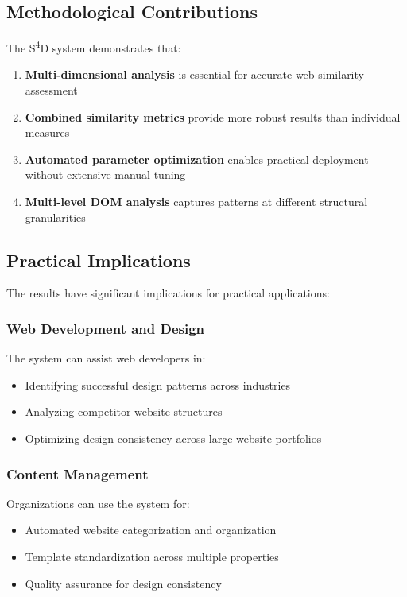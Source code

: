 \subsection{Methodological Contributions}
\label{subsec:methodological-contributions}

The S\textsuperscript{4}D system demonstrates that:

\begin{enumerate}
    \item \textbf{Multi-dimensional analysis} is essential for accurate web similarity assessment
    \item \textbf{Combined similarity metrics} provide more robust results than individual measures
    \item \textbf{Automated parameter optimization} enables practical deployment without extensive manual tuning
    \item \textbf{Multi-level DOM analysis} captures patterns at different structural granularities
\end{enumerate}

\subsection{Practical Implications}
\label{subsec:practical-implications}

The results have significant implications for practical applications:

\subsubsection{Web Development and Design}
The system can assist web developers in:
\begin{itemize}
    \item Identifying successful design patterns across industries
    \item Analyzing competitor website structures
    \item Optimizing design consistency across large website portfolios
\end{itemize}

\subsubsection{Content Management}
Organizations can use the system for:
\begin{itemize}
    \item Automated website categorization and organization
    \item Template standardization across multiple properties
    \item Quality assurance for design consistency
\end{itemize}

